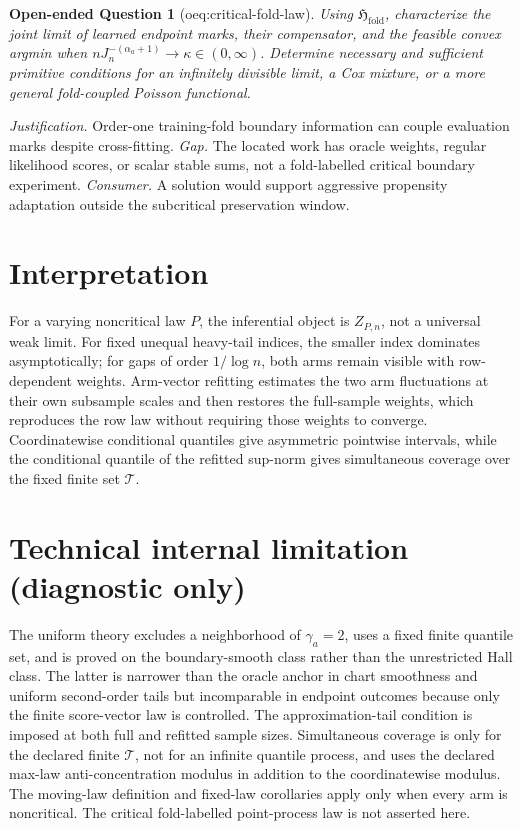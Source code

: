 \documentclass{article}
\newtheorem{openendedquestion}{Open-ended Question}
\begin{document}
\begin{openendedquestion}[oeq:critical-fold-law]\label{oeq:critical-fold-law}
Using \(\mathfrak H_{\mathrm{fold}}\), characterize the joint limit of learned endpoint marks, their compensator, and the feasible convex argmin when \(nJ_n^{-(\alpha_a+1)}\to\kappa\in(0,\infty)\). Determine necessary and sufficient primitive conditions for an infinitely divisible limit, a Cox mixture, or a more general fold-coupled Poisson functional.
\end{openendedquestion}
\par\smallskip\noindent \textit{Justification.} Order-one training-fold boundary information can couple evaluation marks despite cross-fitting. \textit{Gap.} The located work has oracle weights, regular likelihood scores, or scalar stable sums, not a fold-labelled critical boundary experiment. \textit{Consumer.} A solution would support aggressive propensity adaptation outside the subcritical preservation window.

\section{Interpretation}

For a varying noncritical law \(P\), the inferential object is \(Z_{P,n}\), not a universal weak limit. For fixed unequal heavy-tail indices, the smaller index dominates asymptotically; for gaps of order \(1/\log n\), both arms remain visible with row-dependent weights. Arm-vector refitting estimates the two arm fluctuations at their own subsample scales and then restores the full-sample weights, which reproduces the row law without requiring those weights to converge. Coordinatewise conditional quantiles give asymmetric pointwise intervals, while the conditional quantile of the refitted sup-norm gives simultaneous coverage over the fixed finite set \(\mathcal T\).

\section*{Technical internal limitation (diagnostic only)}

The uniform theory excludes a neighborhood of \(\gamma_a=2\), uses a fixed finite quantile set, and is proved on the boundary-smooth class rather than the unrestricted Hall class. The latter is narrower than the oracle anchor in chart smoothness and uniform second-order tails but incomparable in endpoint outcomes because only the finite score-vector law is controlled. The approximation-tail condition is imposed at both full and refitted sample sizes. Simultaneous coverage is only for the declared finite \(\mathcal T\), not for an infinite quantile process, and uses the declared max-law anti-concentration modulus in addition to the coordinatewise modulus. The moving-law definition and fixed-law corollaries apply only when every arm is noncritical. The critical fold-labelled point-process law is not asserted here.
\end{document}
